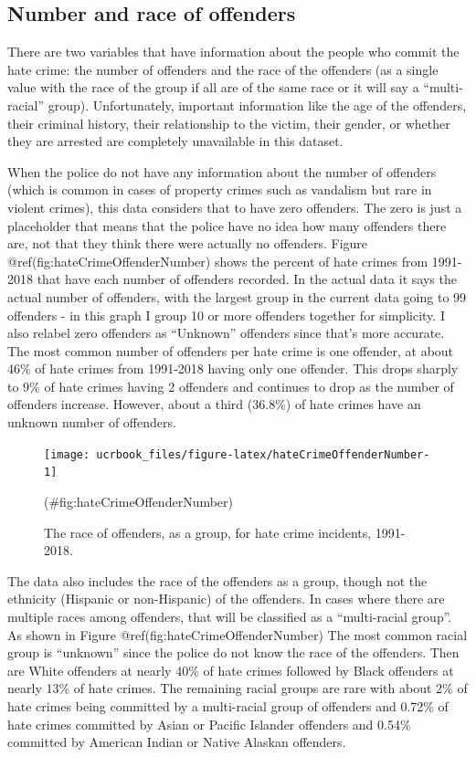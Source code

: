 \documentclass[
  12pt,
  openany]{book}
\begin{document}
\hypertarget{number-and-race-of-offenders}{%
\subsection{Number and race of offenders}\label{number-and-race-of-offenders}}

There are two variables that have information about the people who commit the hate crime: the number of offenders and the race of the offenders (as a single value with the race of the group if all are of the same race or it will say a ``multi-racial'' group). Unfortunately, important information like the age of the offenders, their criminal history, their relationship to the victim, their gender, or whether they are arrested are completely unavailable in this dataset.

When the police do not have any information about the number of offenders (which is common in cases of property crimes such as vandalism but rare in violent crimes), this data considers that to have zero offenders. The zero is just a placeholder that means that the police have no idea how many offenders there are, not that they think there were actually no offenders. Figure @ref(fig:hateCrimeOffenderNumber) shows the percent of hate crimes from 1991-2018 that have each number of offenders recorded. In the actual data it says the actual number of offenders, with the largest group in the current data going to 99 offenders - in this graph I group 10 or more offenders together for simplicity. I also relabel zero offenders as ``Unknown'' offenders since that's more accurate. The most common number of offenders per hate crime is one offender, at about 46\% of hate crimes from 1991-2018 having only one offender. This drops sharply to 9\% of hate crimes having 2 offenders and continues to drop as the number of offenders increase. However, about a third (36.8\%) of hate crimes have an unknown number of offenders.

\begin{figure}

{\centering \texttt{[image: ucrbook\_files/figure-latex/hateCrimeOffenderNumber-1]} 

}

\caption{The race of offenders, as a group, for hate crime incidents, 1991-2018.}(\#fig:hateCrimeOffenderNumber)
\end{figure}

The data also includes the race of the offenders as a group, though not the ethnicity (Hispanic or non-Hispanic) of the offenders. In cases where there are multiple races among offenders, that will be classified as a ``multi-racial group''. As shown in Figure @ref(fig:hateCrimeOffenderNumber) The most common racial group is ``unknown'' since the police do not know the race of the offenders. Then are White offenders at nearly 40\% of hate crimes followed by Black offenders at nearly 13\% of hate crimes. The remaining racial groups are rare with about 2\% of hate crimes being committed by a multi-racial group of offenders and 0.72\% of hate crimes committed by Asian or Pacific Islander offenders and 0.54\% committed by American Indian or Native Alaskan offenders.
\end{document}
